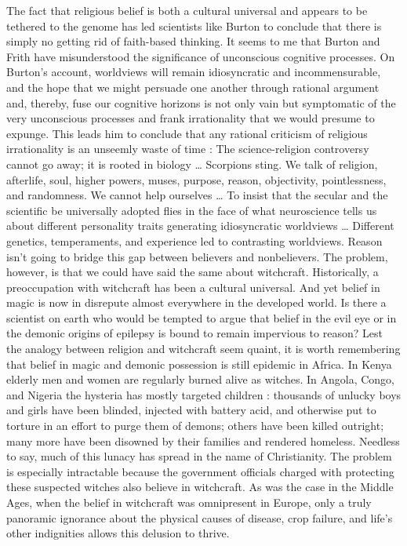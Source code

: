 \documentclass[a4paper,14pt]{extbook}
\begin{document}
The fact that religious belief is both a cultural universal and appears to be tethered to the genome has led scientists like Burton to conclude that there is simply no getting rid of faith-based thinking.
It seems to me that Burton and Frith have misunderstood the significance of unconscious cognitive processes.
On Burton’s account, worldviews will remain idiosyncratic and incommensurable, and the hope that we might persuade one another through rational argument and, thereby, fuse our cognitive horizons is not only vain but symptomatic of the very unconscious processes and frank irrationality that we would presume to expunge.
This leads him to conclude that any rational criticism of religious irrationality is an unseemly waste of time :
The science-religion controversy cannot go away;
it is rooted in biology \dots
Scorpions sting.
We talk of religion, afterlife, soul, higher powers, muses, purpose, reason, objectivity, pointlessness, and randomness.
We cannot help ourselves \dots
To insist that the secular and the scientific be universally adopted flies in the face of what neuroscience tells us about different personality traits generating idiosyncratic worldviews \dots
Different genetics, temperaments, and experience led to contrasting worldviews.
Reason isn’t going to bridge this gap between believers and nonbelievers.
The problem, however, is that we could have said the same about witchcraft.
Historically, a preoccupation with witchcraft has been a cultural universal.
And yet belief in magic is now in disrepute almost everywhere in the developed world.
Is there a scientist on earth who would be tempted to argue that belief in the evil eye or in the demonic origins of epilepsy is bound to remain impervious to reason?
Lest the analogy between religion and witchcraft seem quaint, it is worth remembering that belief in magic and demonic possession is still epidemic in Africa.
In Kenya elderly men and women are regularly burned alive as witches.
In Angola, Congo, and Nigeria the hysteria has mostly targeted children :
thousands of unlucky boys and girls have been blinded, injected with battery acid, and otherwise put to torture in an effort to purge them of demons;
others have been killed outright;
many more have been disowned by their families and rendered homeless.
Needless to say, much of this lunacy has spread in the name of Christianity.
The problem is especially intractable because the government officials charged with protecting these suspected witches also believe in witchcraft.
As was the case in the Middle Ages, when the belief in witchcraft was omnipresent in Europe, only a truly panoramic ignorance about the physical causes of disease, crop failure, and life’s other indignities allows this delusion to thrive.
\end{document}

